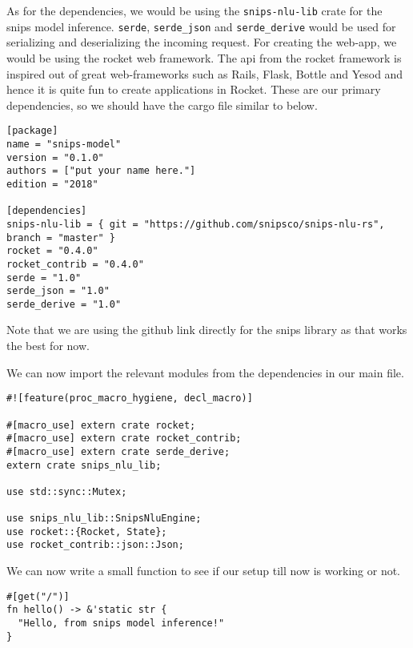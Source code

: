 \documentclass{book}
\begin{document}
As for the dependencies, we would be using the \lstinline{snips-nlu-lib} crate for the snips model inference. \lstinline{serde}, \lstinline{serde_json} and \lstinline{serde_derive} would be used for serializing and deserializing the incoming request. For creating the web-app, we would be using the rocket web framework. The api from the rocket framework is inspired out of great web-frameworks such as Rails, Flask, Bottle and Yesod and hence it is quite fun to create applications in Rocket. These are our primary dependencies, so we should have the cargo file similar to below.

\begin{lstlisting}[caption={chapter5\\/snips\\-model\\/Cargo\\.toml}, basicstyle=\small]
[package]
name = "snips-model"
version = "0.1.0"
authors = ["put your name here."]
edition = "2018"

[dependencies]
snips-nlu-lib = { git = "https://github.com/snipsco/snips-nlu-rs", branch = "master" }
rocket = "0.4.0"
rocket_contrib = "0.4.0"
serde = "1.0"
serde_json = "1.0"
serde_derive = "1.0"
\end{lstlisting}

Note that we are using the github link directly for the snips library as that works the best for now.

We can now import the relevant modules from the dependencies in our main file.

\begin{lstlisting}[caption={chapter5\\/snips\\-model\\/src\\/main\\.rs}, basicstyle=\small]
#![feature(proc_macro_hygiene, decl_macro)]

#[macro_use] extern crate rocket;
#[macro_use] extern crate rocket_contrib;
#[macro_use] extern crate serde_derive;
extern crate snips_nlu_lib;

use std::sync::Mutex;

use snips_nlu_lib::SnipsNluEngine;
use rocket::{Rocket, State};
use rocket_contrib::json::Json;
\end{lstlisting}

We can now write a small function to see if our setup till now is working or not.

\begin{lstlisting}[caption={chapter5\\/snips\\-model\\/src\\/main\\.rs}, basicstyle=\small]
#[get("/")]
fn hello() -> &'static str {
  "Hello, from snips model inference!"
}
\end{lstlisting}
\end{document}
